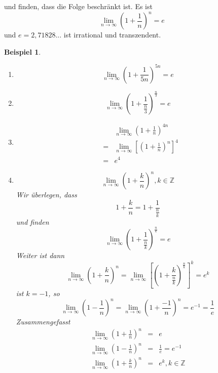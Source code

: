 \documentclass[a4paper,10pt]{report}
\newtheorem{myexample}{Beispiel}
\begin{document}
und finden, dass die Folge beschränkt ist. Es ist
\begin{equation*}\boxed{\lim_{n \to \infty} (1 + \frac{1}{n})^n = e}\end{equation*}
und $e = 2,71828...$ ist irrational und transzendent.
\begin{myexample}
\begin{enumerate}
\item \begin{equation*}\lim_{n \to \infty} ( 1 + \frac{1}{5n})^{5n} = e\end{equation*}
\item \begin{equation*}\lim_{n \to \infty} ( 1 + \frac{1}{\frac{n}{3}})^{\frac{n}{3}} = e\end{equation*}
\item 
	\begin{eqnarray*}
		&&\lim_{n \to \infty} ( 1 + \frac{1}{n})^{4n} \\
		&=& \lim_{n \to \infty}[ ( 1 + \frac{1}{n})^{n}]^4\\ 
		&=& e^4
	\end{eqnarray*}
\item
\begin{equation*}\lim_{n \to \infty} ( 1 + \frac{k}{n})^n, k \in \mathbb{Z}\end{equation*}
Wir überlegen, dass
\begin{equation*}1 + \frac{k}{n}  =1 + \frac{1}{\frac{n}{k}}\end{equation*}
und finden
\begin{equation*}\lim_{n \to \infty} ( 1 + \frac{1}{\frac{n}{k}})^\frac{n}{k} = e\end{equation*}
Weiter ist dann
\begin{equation*}\lim_{n \to \infty} (1 + \frac{k}{n})^n = \lim_{n \to \infty}[(1 + \frac{k}{\frac{n}{k}})^\frac{n}{k}]^k = e^k\end{equation*}
ist $k = -1$, so
\begin{equation*}\lim_{n \to \infty} (1 - \frac{1}{n})^n = \lim_{n \to \infty} (1 + \frac{-1}{n})^n = e^{-1} = \frac{1}{e}\end{equation*}
Zusammengefasst
\begin{eqnarray}\lim_{n \to \infty} (1 + \frac{1}{n})^n & = & e\\
\lim_{n \to \infty} (1 - \frac{1}{n})^n & = & \frac{1}{e} = e^{-1}\\
\lim_{n \to \infty} (1 + \frac{k}{n})^n & = & e^k, k \in \mathbb{Z}\end{eqnarray}
\end{enumerate}\end{myexample}
\newpage
\end{document}
